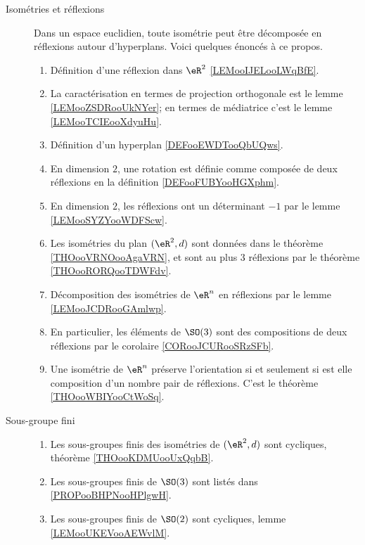 \begin{description}
    \item[Isométries et réflexions]
        Dans un espace euclidien, toute isométrie peut être décomposée en réflexions autour d'hyperplans. Voici quelques énoncés à ce propos.
\begin{enumerate}
    \item
        Définition d'une réflexion dans \( \eR^2\) \ref{LEMooIJELooLWqBfE}.
    \item
        La caractérisation en termes de projection orthogonale est le lemme \ref{LEMooZSDRooUkNYer}; en termes de médiatrice c'est le lemme \ref{LEMooTCIEooXdyuHu}.
    \item
        Définition d'un hyperplan \ref{DEFooEWDTooQbUQws}.
    \item
        En dimension \( 2\), une rotation est définie comme composée de deux réflexions en la définition \ref{DEFooFUBYooHGXphm}.
    \item
        En dimension \( 2\), les réflexions ont un déterminant \( -1\) par le lemme \ref{LEMooSYZYooWDFScw}.
    \item
        Les isométries du plan \( (\eR^2,d)\) sont données dans le théorème \ref{THOooVRNOooAgaVRN}, et sont au plus 3 réflexions par le théorème \ref{THOooRORQooTDWFdv}.
    \item
        Décomposition des isométries de \( \eR^n\) en réflexions par le lemme \ref{LEMooJCDRooGAmlwp}.
    \item
        En particulier, les éléments de \( \SO(3)\) sont des compositions de deux réflexions par le corolaire \ref{CORooJCURooSRzSFb}.
    \item
        Une isométrie de \( \eR^n\) préserve l'orientation si et seulement si est elle composition d'un nombre pair de réflexions. C'est le théorème \ref{THOooWBIYooCtWoSq}.
\end{enumerate}
\item[Sous-groupe fini]
    \begin{enumerate}
        \item
            Les sous-groupes finis des isométries de \( (\eR^2,d)\) sont cycliques, théorème \ref{THOooKDMUooUxQqbB}.
        \item
            Les sous-groupes finis de \( \SO(3)\) sont listés dans \ref{PROPooBHPNooHPlgwH}.
        \item
            Les sous-groupes finis de \( \SO(2)\) sont cycliques, lemme \ref{LEMooUKEVooAEWvlM}.
    \end{enumerate}
\end{description}


